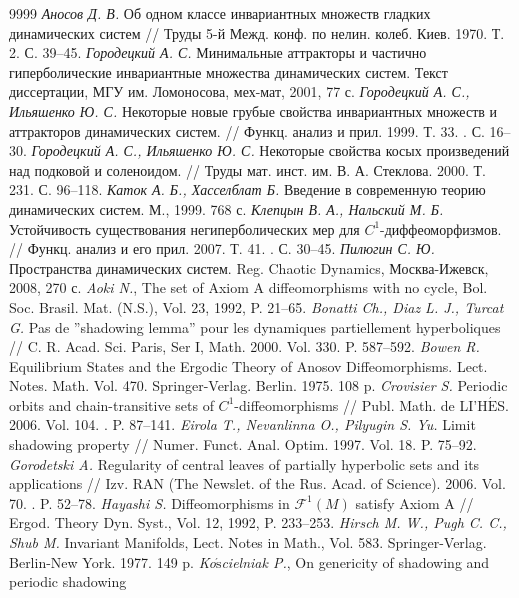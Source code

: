 \documentclass[12pt]{article}
\begin{document}
\begin{thebibliography}{9999}
\textit{Аносов Д. В.} Об одном классе инвариантных множеств гладких
динамических систем // Труды 5-й Межд. конф. по нелин. колеб. Киев. 1970. Т. 2. С. 39--45.
 \textit{Городецкий А. С.} Минимальные аттракторы и частично гиперболические инвариантные множества динамических систем. Текст диссертации, МГУ им. Ломоносова, мех-мат, 2001, 77 с.
\textit{Городецкий А. С., Ильяшенко Ю. С.} Некоторые новые грубые свойства инвариантных множеств и аттракторов динамических систем. // Функц. анализ и прил. 1999. Т. 33. . С. 16--30.
\textit{Городецкий А. С., Ильяшенко Ю. С.} Некоторые свойства косых произведений над подковой и соленоидом. // Труды мат. инст. им. В. А. Стеклова. 2000. Т. 231. С. 96--118.
\textit{Каток А. Б., Хасселблат Б.} Введение в современную теорию динамических систем. М., 1999. 768 с.
\textit{Клепцын В. А., Нальский М. Б.} Устойчивость существования негиперболических мер для $C^1$-диффеоморфизмов. // Функц. анализ и его прил. 2007. Т. 41. . С. 30--45. 
\textit{Пилюгин С. Ю.} Пространства динамических систем. Reg. Chaotic Dynamics, Москва-Ижевск, 2008, 270 с.
\textit{Aoki N.}, The set of Axiom A diffeomorphisms with no cycle, Bol.
Soc. Brasil. Mat. (N.S.), Vol. 23, 1992, P. 21--65.
 \textit{Bonatti Ch., Diaz L. J., Turcat G.} Pas de ''shadowing lemma'' pour les dynamiques partiellement hyperboliques // C. R. Acad. Sci. Paris, Ser I, Math. 2000. Vol. 330. P. 587--592.
\textit{Bowen R.} Equilibrium States and the Ergodic Theory of Anosov
Diffeomorphisms. Lect. Notes. Math. Vol. 470. Springer-Verlag.
Berlin. 1975. 108 p.
 \textit{Crovisier S.} Periodic orbits and chain-transitive sets of $C^1$-diffeomorphisms // Publ. Math. de LI'H$\acute{\mbox{E}}$S. 2006. Vol. 104. . P. 87--141.
 \textit{Eirola T., Nevanlinna O., Pilyugin S. Yu.} Limit shadowing property // Numer. Funct. Anal. Optim. 1997. Vol. 18. P. 75--92.
\textit{Gorodetski A.} Regularity of central leaves of partially hyperbolic sets and its applications // Izv. RAN (The Newslet. of the Rus. Acad. of Science). 2006. Vol. 70. . P. 52--78.
\textit{Hayashi S.} Diffeomorphisms in $\mathcal{F}^1(M)$ satisfy Axiom A // Ergod. Theory
Dyn. Syst., Vol. 12, 1992, P. 233--253.
\textit{Hirsch M. W., Pugh C. C., Shub M.} Invariant Manifolds, Lect. Notes in Math., Vol. 583. Springer-Verlag. Berlin-New York. 1977. 149 p.
\textit{Ko$\acute{\mbox{s}}$cielniak P.}, On genericity of shadowing and periodic shadowing

\end{thebibliography}
\end{document}

